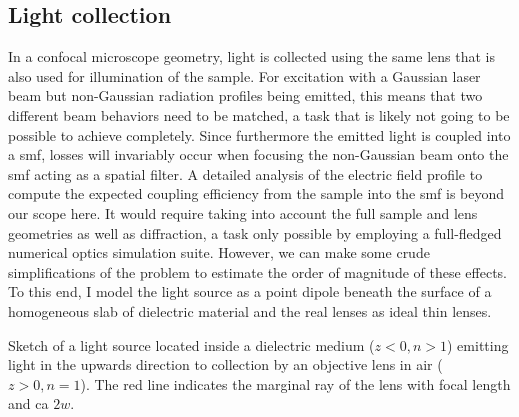 \subsection{Light collection}\label{sec:setup:optics:coupling:detection}
In a confocal microscope geometry, light is collected using the same lens that is also used for illumination of the sample.
For excitation with a Gaussian laser beam but non-Gaussian radiation profiles being emitted, this means that two different beam behaviors need to be matched, a task that is likely not going to be possible to achieve completely.
Since furthermore the emitted light is coupled into a \gls{smf}, losses will invariably occur when focusing the non-Gaussian beam onto the \gls{smf} acting as a spatial filter.
A detailed analysis of the electric field profile to compute the expected coupling efficiency from the sample into the \gls{smf} is beyond our scope here.
It would require taking into account the full sample and lens geometries as well as diffraction, a task only possible by employing a full-fledged numerical optics simulation suite.
However, we can make some crude simplifications of the problem to estimate the order of magnitude of these effects.
To this end, I model the light source as a point dipole beneath the surface of a homogeneous slab of dielectric material and the real lenses as ideal thin lenses.

\begin{marginfigure}
    
    \caption[]{
        Sketch of a light source located inside a dielectric medium ($z < 0, n > 1$) emitting light in the upwards direction to collection by an objective lens in air ($z > 0, n = 1$).
        The red line indicates the marginal ray of the lens with focal length \fob and \gls{ca} $2w$.
    }
    \label{fig:setup:optics:coupling:emission}
\end{marginfigure}

